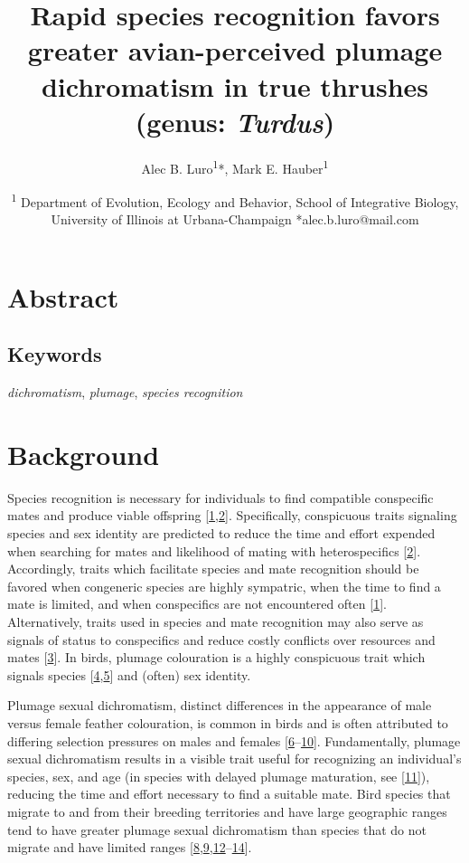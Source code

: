 \documentclass[
  a4paper,
]{article}
\title{Rapid species recognition favors greater avian-perceived plumage
dichromatism in true thrushes (genus: \emph{Turdus})}
\author{Alec B. Luro\textsuperscript{1}*, Mark E.
Hauber\textsuperscript{1}}
\date{\textsuperscript{1} Department of Evolution, Ecology and Behavior,
School of Integrative Biology, University of Illinois at
Urbana-Champaign *alec.b.luro@mail.com}
\begin{document}
\maketitle

\hypertarget{abstract}{%
\section{Abstract}\label{abstract}}

\hypertarget{keywords}{%
\subsection{Keywords}\label{keywords}}

\emph{dichromatism}, \emph{plumage}, \emph{species recognition}

\hypertarget{background}{%
\section{Background}\label{background}}

Species recognition is necessary for individuals to find compatible
conspecific mates and produce viable offspring
{[}\protect\hyperlink{ref-andersson1994}{1},\protect\hyperlink{ref-groning2008}{2}{]}.
Specifically, conspicuous traits signaling species and sex identity are
predicted to reduce the time and effort expended when searching for
mates and likelihood of mating with heterospecifics
{[}\protect\hyperlink{ref-groning2008}{2}{]}. Accordingly, traits which
facilitate species and mate recognition should be favored when
congeneric species are highly sympatric, when the time to find a mate is
limited, and when conspecifics are not encountered often
{[}\protect\hyperlink{ref-andersson1994}{1}{]}. Alternatively, traits
used in species and mate recognition may also serve as signals of status
to conspecifics and reduce costly conflicts over resources and mates
{[}\protect\hyperlink{ref-west-eberhard1983}{3}{]}. In birds, plumage
colouration is a highly conspicuous trait which signals species
{[}\protect\hyperlink{ref-martin2015a}{4},\protect\hyperlink{ref-bitton2016}{5}{]}
and (often) sex identity.

Plumage sexual dichromatism, distinct differences in the appearance of
male versus female feather colouration, is common in birds and is often
attributed to differing selection pressures on males and females
{[}\protect\hyperlink{ref-martin1996}{6}--\protect\hyperlink{ref-dunn2015}{10}{]}.
Fundamentally, plumage sexual dichromatism results in a visible trait
useful for recognizing an individual's species, sex, and age (in species
with delayed plumage maturation, see
{[}\protect\hyperlink{ref-hawkins2012}{11}{]}), reducing the time and
effort necessary to find a suitable mate. Bird species that migrate to
and from their breeding territories and have large geographic ranges
tend to have greater plumage sexual dichromatism than species that do
not migrate and have limited ranges
{[}\protect\hyperlink{ref-badyaev2003}{8},\protect\hyperlink{ref-dale2015}{9},\protect\hyperlink{ref-friedman2009}{12}--\protect\hyperlink{ref-matysiokova2017}{14}{]}.
\end{document}
